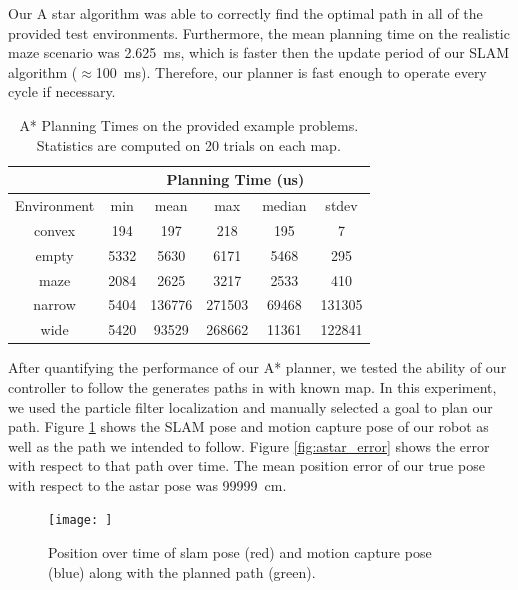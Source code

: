 \documentclass[journal]{IEEEtran}
\begin{document}
            Our A star algorithm was able to correctly find the optimal path in all of the provided test environments. Furthermore, the mean planning time on the realistic maze scenario was \SI{2.625}{\milli\second}, which is faster then the update period of our SLAM algorithm ($\approx$\SI{100}{\milli\second}). Therefore, our planner is fast enough to operate every cycle if necessary.
            
            \begin{table}
                \centering
                \begin{tabular}{|c|c|c|c|c|c|} \hline
                    & \multicolumn{5}{c|}{Planning Time (us)} \\ \hline
                    Environment & min & mean & max & median & stdev \\ \hline
                    convex & 194 & 197 & 218 & 195 & 7 \\ \hline
                    empty & 5332 & 5630 & 6171 & 5468 & 295 \\ \hline
                    maze & 2084 & 2625 & 3217 & 2533 & 410 \\ \hline
                    narrow & 5404 & 136776 & 271503 & 69468 & 131305 \\ \hline
                    wide & 5420 & 93529 & 268662 & 11361 & 122841 \\ \hline
                \end{tabular}
                \caption{A* Planning Times on the provided example problems. Statistics are computed on 20 trials on each map.}
                \label{tab:a_star_times}
            \end{table}
        
            After quantifying the performance of our A* planner, we tested the ability of our controller to follow the generates paths in with known map. In this experiment, we used the particle filter localization and manually selected a goal to plan our path. Figure \ref{fig:astar} shows the SLAM pose and motion capture pose of our robot as well as the path we intended to follow. Figure \ref{fig:astar_error} shows the error with respect to that path over time. The mean position error of our true pose with respect to the astar pose was \SI{99999}{\centi\meter}.
            
            \begin{figure}
                \centering
                \texttt{[image: ]}
                \caption{Position over time of slam pose (red) and motion capture pose (blue) along with the planned path (green).}
                \label{fig:astar}
            \end{figure}
            
\end{document}
